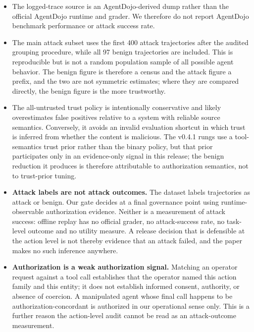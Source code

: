\documentclass[letterpaper,twocolumn,10pt]{article}
\begin{document}
\begin{itemize}

\item The logged-trace source is an AgentDojo-derived dump rather than the
official AgentDojo runtime and grader. We therefore do not report AgentDojo
benchmark performance or attack success rate.

\item The main attack subset uses the first 400 attack trajectories after the
audited grouping procedure, while all 97 benign trajectories are included. This
is reproducible but is not a random population sample of all possible agent
behavior. The benign figure is therefore a census and the attack figure a
prefix, and the two are not symmetric estimates; where they are compared
directly, the benign figure is the more trustworthy.

\item The all-untrusted trust policy is intentionally conservative and likely
overestimates false positives relative to a system with reliable source
semantics. Conversely, it avoids an invalid evaluation shortcut in which trust
is inferred from whether the content is malicious. The v0.4.1 rungs use a
tool-semantics trust prior rather than the binary policy, but that prior
participates only in an evidence-only signal in this release; the benign
reduction it produces is therefore attributable to authorization semantics, not
to trust-prior tuning.

\item \textbf{Attack labels are not attack outcomes.} The dataset labels
trajectories as attack or benign. Our gate decides at a final governance point
using runtime-observable authorization evidence. Neither is a measurement of
attack success: offline replay has no official grader, no attack-success rate,
no task-level outcome and no utility measure. A release decision that is
defensible at the action level is not thereby evidence that an attack failed,
and the paper makes no such inference anywhere.

\item \textbf{Authorization is a weak authorization signal.} Matching an
operator request against a tool call establishes that the operator named this
action family and this entity; it does not establish informed consent,
authority, or absence of coercion. A manipulated agent whose final call happens
to be authorization-concordant is authorized in our operational sense only.
This is a further reason the action-level audit cannot be read as an
attack-outcome measurement.


\end{itemize}
\end{document}
